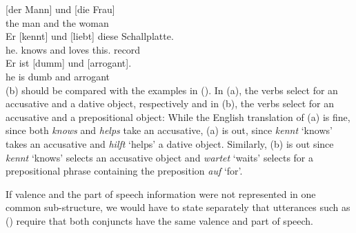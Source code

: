 \eal
\ex 
\gll {}[der Mann] und [die Frau]\\
	 {}\spacebr{}the man and \spacebr{}the woman\\
\ex 
\gll Er [kennt] und [liebt] diese Schallplatte.\\
	 he.\nom{} \spacebr{}knows and \spacebr{}loves this.\acc{} record\\
\ex 
\gll Er ist [dumm] und [arrogant].\\
	he is \spacebr{}dumb and \spacebr{}arrogant\\
\zl
(b) should be compared with the examples in (). In (a), the verbs select for an
accusative and a dative object, respectively and in (b), the verbs select for an accusative
and a prepositional object:
\eal
{}
\zl
While the English translation of (a) is fine, since both \emph{knows} and \emph{helps} take an
accusative, (a) is out, since \emph{kennt} `knows' takes an accusative and \emph{hilft}
`helps' a dative object. Similarly, (b) is out since \emph{kennt} `knows' selects an accusative object and
\emph{wartet} `waits' selects for a prepositional phrase containing the preposition \emph{auf} `for'.

If valence and the part of speech information were not represented in one common sub-structure, we would
have to state separately that utterances such as () require that both
conjuncts have the same valence and part of speech.

